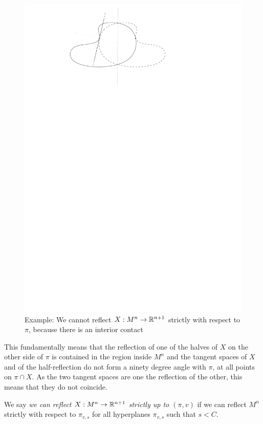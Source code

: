 \begin{figure}
	\centering
	\includegraphics[width=\textwidth]{"figures/8_interior_contact"}
	\caption{Example: We cannot reflect $X: M^n\rightarrow \mathbb{R}^{n+1}$ strictly with respect to $\pi$, because there is an interior contact}
\end{figure}

This fundamentally means that the reflection of one of the halves of $X$ on the other side of $\pi$ is contained in the region inside $M^n$ and the tangent spaces of $X$ and of the half-reflection do not form a ninety degree angle with $\pi$, at all points on $\pi\cap X$. As the two tangent spaces are one the reflection of the other, this means that they do not coincide.   
\begin{defin}
	We say {\em we can reflect $X: M^n\rightarrow \mathbb{R}^{n+1}$ strictly up to $(\pi,v)$} if we can reflect $M^n$ strictly with respect to $\pi_{v, s}$ for all hyperplanes $\pi_{v, s}$ such that $s<C$.  
\end{defin}

